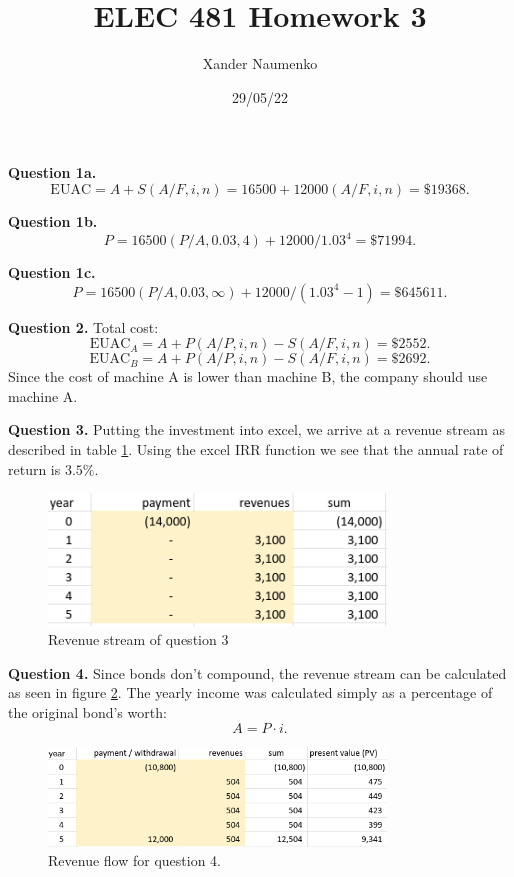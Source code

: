 \documentclass[letterpaper, reqno,11pt]{article}
\begin{document}
\title{ELEC 481 Homework 3}
\date{29/05/22}
\author{Xander Naumenko}
\maketitle


{\noindent\bf Question 1a.} 
\[
\text{EUAC}=A+S(A/F, i, n)=16500+12000(A /F, i, n)=\$19368
.\]

{\noindent\bf Question 1b.} 
\[
P=16500(P /A, 0.03, 4)+12000 / 1.03^{4}=\$71994
.\]

{\noindent\bf Question 1c.} 
\[
P=16500(P /A, 0.03, \infty)+12000 / (1.03^{4}-1)=\$645611
.\]

{\noindent\bf Question 2.} Total cost: 
\[
\text{EUAC}_A=A+P(A /P, i, n)-S (A/F, i, n)=\$2552
.\]
\[
\text{EUAC}_B=A+P(A /P, i, n)-S (A/F, i, n)=\$2692
.\]
Since the cost of machine A is lower than machine B, the company should use machine A. 

{\noindent\bf Question 3.} Putting the investment into excel, we arrive at a revenue stream as described in table \ref{fig:q3}. Using the excel IRR function we see that the annual rate of return is $3.5\%$. 

\begin{figure}[htpb]
    \centering
    \includegraphics[width=0.8\textwidth]{q3}
    \caption{Revenue stream of question 3}
    \label{fig:q3}
\end{figure}

{\noindent\bf Question 4.} Since bonds don't compound, the revenue stream can be calculated as seen in figure \ref{fig:q4}. The yearly income was calculated simply as a percentage of the original bond's worth: 
\[
A=P\cdot i
.\]

\begin{figure}[htpb]
    \centering
    \includegraphics[width=0.8\textwidth]{q4}
    \caption{Revenue flow for question 4. }
    \label{fig:q4}
\end{figure}
\end{document}

